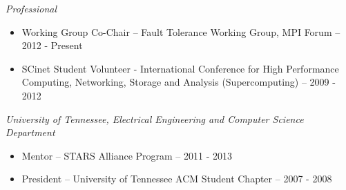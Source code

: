 {\sl Professional}
\begin{itemize}
    \item Working Group Co-Chair -- Fault Tolerance Working Group, MPI Forum -- 2012 - Present
    \item SCinet Student Volunteer - International Conference for High
        Performance Computing, Networking, Storage and Analysis
        (Supercomputing) -- 2009 - 2012
\end{itemize}

{\sl University of Tennessee, Electrical Engineering and Computer Science Department}
\begin{itemize}
    \item Mentor -- STARS Alliance Program -- 2011 - 2013
    \item President -- University of Tennessee ACM Student Chapter -- 2007 - 2008
\end{itemize}
